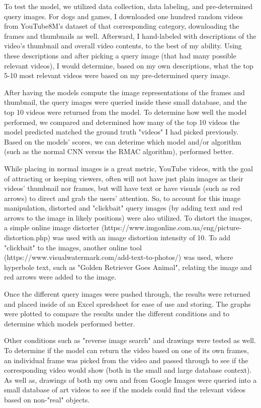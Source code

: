 \documentclass[10pt,twocolumn]{article}
\begin{document}
To test the model, we utilized data collection, data labeling, and pre-determined query images. For dogs and games, I downloaded one hundred random videos from YouTube8M's dataset of that corresponding category, downloading the frames and thumbnails as well. Afterward, I hand-labeled with descriptions of the video's thumbnail and overall video contents, to the best of my ability. Using these descriptions and after picking a query image (that had many possible relevant videos), I would determine, based on my own descriptions, what the top 5-10 most relevant videos were based on my pre-determined query image. 

After having the models compute the image representations of the frames and thumbnail, the query images were queried inside these small database, and the top 10 videos were returned from the model. To determine how well the model performed, we compared and determined how many of the top 10 videos the model predicted matched the ground truth "videos" I had picked previously. Based on the models' scores, we can deterime which model and/or algorithm (such as the normal CNN versus the RMAC algorithm), performed better.

While placing in normal images is a great metric, YouTube videos, with the goal of attracting or keeping viewers, often will not have just plain images as their videos' thumbnail nor frames, but will have text or have visuals (such as red arrows) to direct and grab the users' attention. So, to account for this image manipulation, distorted and "clickbait" query images (by adding text and red arrows to the image in likely positions) were also utilized. To distort the images, a simple online image distorter (https://www.imgonline.com.ua/eng/picture-distortion.php) was used with an image distortion intensity of 10. To add "clickbait" to the images, another online tool (https://www.visualwatermark.com/add-text-to-photos/) was used, where hyperbole text, such as "Golden Retriever Goes Animal", relating the image and red arrows were added to the image.

Once the different query images were pushed through, the results were returned and placed inside of an Excel spredsheet for ease of use and storing. The graphs were plotted to compare the results under the different conditions and to determine which models performed better.

Other conditions such as "reverse image search" and drawings were tested as well. To determine if the model can return the video based on one of its own frames, an individual frame was picked from the video and passed through to see if the corresponding video would show (both in the small and large database context). As well as, drawings of both my own and from Google Images were queried into a small database of art videos to see if the models could find the relevant videos based on non-"real" objects.
\end{document}
